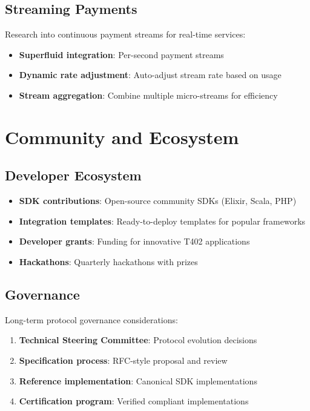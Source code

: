 \subsection{Streaming Payments}

Research into continuous payment streams for real-time services:

\begin{itemize}
    \item \textbf{Superfluid integration}: Per-second payment streams
    \item \textbf{Dynamic rate adjustment}: Auto-adjust stream rate based on usage
    \item \textbf{Stream aggregation}: Combine multiple micro-streams for efficiency
\end{itemize}

\section{Community and Ecosystem}
\label{sec:community}

\subsection{Developer Ecosystem}

\begin{itemize}
    \item \textbf{SDK contributions}: Open-source community SDKs (Elixir, Scala, PHP)
    \item \textbf{Integration templates}: Ready-to-deploy templates for popular frameworks
    \item \textbf{Developer grants}: Funding for innovative T402 applications
    \item \textbf{Hackathons}: Quarterly hackathons with prizes
\end{itemize}

\subsection{Governance}

Long-term protocol governance considerations:

\begin{enumerate}
    \item \textbf{Technical Steering Committee}: Protocol evolution decisions
    \item \textbf{Specification process}: RFC-style proposal and review
    \item \textbf{Reference implementation}: Canonical SDK implementations
    \item \textbf{Certification program}: Verified compliant implementations
\end{enumerate}

